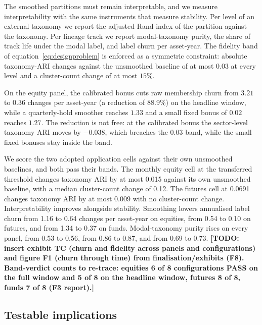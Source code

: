 \documentclass{rQUF2e}
\theoremstyle{plain}
\theoremstyle{remark}
\newcommand{\TODO}[1]{\textbf{[TODO: #1]}}
\begin{document}
The smoothed partitions must remain interpretable, and we measure
interpretability with the same instruments that measure stability. Per level
of an external taxonomy we report the adjusted Rand index of the partition
against the taxonomy. Per lineage track we report modal-taxonomy purity, the
share of track life under the modal label, and label churn per asset-year. The
fidelity band of equation~\eqref{eq:designproblem} is enforced as a symmetric
constraint: absolute taxonomy-ARI changes against the unsmoothed baseline of
at most $0.03$ at every level and a cluster-count change of at most $15\%$.

On the equity panel, the calibrated bonus cuts raw membership churn from
$3.21$ to $0.36$ changes per asset-year (a reduction of 88.9\%) on the
headline window, while a quarterly-hold smoother reaches $1.33$ and a small
fixed bonus of $0.02$ reaches $1.27$. The reduction is not free: at the
calibrated bonus the sector-level taxonomy ARI moves by $-0.038$, which
breaches the $0.03$ band, while the small fixed bonuses stay inside the band.

We score the two adopted application cells against their own unsmoothed
baselines, and both pass their bands. The monthly equity
cell at the transferred threshold changes taxonomy ARI by at most 0.015
against its own unsmoothed baseline, with a median cluster-count change of
0.12. The futures cell at 0.0691 changes taxonomy ARI by at most 0.009 with
no cluster-count change. Interpretability improves alongside stability.
Smoothing lowers annualised label churn from 1.16 to 0.64 changes per
asset-year on equities, from 0.54 to 0.10 on futures, and from 1.34 to 0.37
on funds. Modal-taxonomy purity rises on every panel, from 0.53 to 0.56, from
0.86 to 0.87, and from 0.69 to 0.73.
\TODO{insert exhibit TC (churn and fidelity across panels and
configurations) and figure F1 (churn through time) from
finalisation/exhibits (F8). Band-verdict counts to re-trace: equities 6 of 8
configurations PASS on the full window and 5 of 8 on the headline window,
futures 8 of 8, funds 7 of 8 (F3 report).}

\subsection{Testable implications}
\label{sec:predictions}
\end{document}
